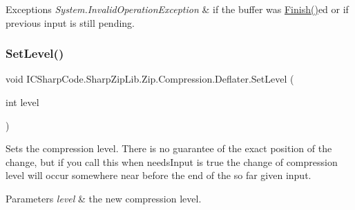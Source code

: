 \begin{DoxyExceptions}{Exceptions}
{\em System.\+Invalid\+Operation\+Exception} & if the buffer was \hyperlink{class_i_c_sharp_code_1_1_sharp_zip_lib_1_1_zip_1_1_compression_1_1_deflater_a4a1b79d68b91057d4044d1d657b81f6c}{Finish()}ed or if previous input is still pending. \\
\hline
\end{DoxyExceptions}
\mbox{\label{class_i_c_sharp_code_1_1_sharp_zip_lib_1_1_zip_1_1_compression_1_1_deflater_aeec1f91af74741790108b3af8f877b5e}} 
\subsubsection{\texorpdfstring{Set\+Level()}{SetLevel()}\hspace{0.1cm}{\footnotesize\ttfamily [1/2]}}
{\footnotesize\ttfamily void I\+C\+Sharp\+Code.\+Sharp\+Zip\+Lib.\+Zip.\+Compression.\+Deflater.\+Set\+Level (\begin{DoxyParamCaption}\item[{int}]{level }\end{DoxyParamCaption})\hspace{0.3cm}{\ttfamily [inline]}}



Sets the compression level. There is no guarantee of the exact position of the change, but if you call this when needs\+Input is true the change of compression level will occur somewhere near before the end of the so far given input. 


\begin{DoxyParams}{Parameters}
{\em level} & the new compression level. \\
\hline
\end{DoxyParams}
\mbox{\label{class_i_c_sharp_code_1_1_sharp_zip_lib_1_1_zip_1_1_compression_1_1_deflater_aeec1f91af74741790108b3af8f877b5e}} 
